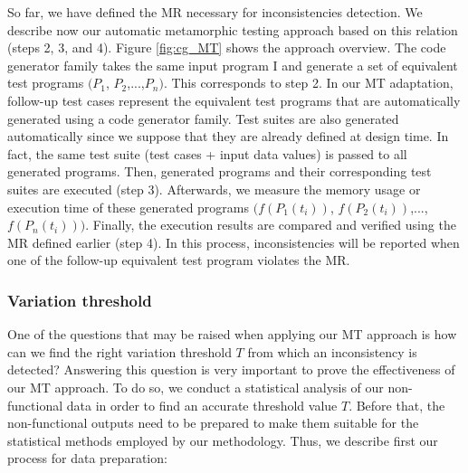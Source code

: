 So far, we have defined the MR necessary for inconsistencies detection. We describe now our automatic metamorphic testing approach based on this relation (steps 2, 3, and 4). 
Figure \ref{fig:cg_MT} shows the approach overview.
The code generator family takes the same input program I and generate a set of equivalent test programs $(P_{1}$, $P_{2}$,...,$P_{n})$. 
This corresponds to step 2. In our MT adaptation, follow-up test cases represent the equivalent test programs that are automatically generated using a code generator family. 
Test suites are also generated automatically since we suppose that they are already defined at design time. In fact, the same test suite (test cases + input data values) is passed to all generated programs. 
Then, generated programs and their corresponding test suites are executed (step 3). Afterwards, we measure the memory usage or execution time of these generated programs $(f(P_{1}(t_{i}))$, $f(P_{2}(t_{i}))$,..., $f(P_{n}(t_{i})))$. Finally, the execution results are compared and verified using the MR defined earlier (step 4).
In this process, inconsistencies will be reported when one of the follow-up equivalent test program violates the MR.





\subsubsection{Variation threshold}
\label{sec:cg-Variation threshold}
One of the questions that may be raised when applying our MT approach is how can we find the right variation threshold $T$ from which an inconsistency is detected? Answering this question is very important to prove the effectiveness of our MT approach.
To do so, we conduct a statistical analysis of our non-functional data in order to find an accurate threshold value $T$.
Before that, the non-functional outputs need to be prepared to make them suitable for the statistical methods employed by our methodology. Thus, we describe first our process for data preparation:

